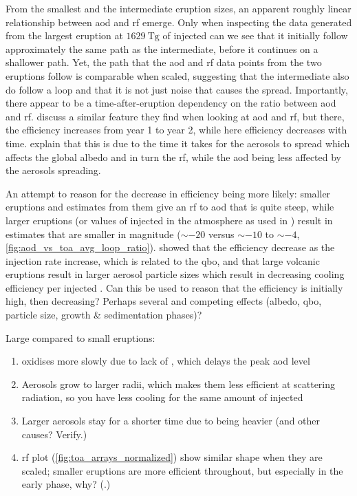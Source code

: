 \documentclass{ametsocV5}
\newcommand{\iso}[1][i]{{#1}njected \ce{SO2}}
\begin{document}
From the smallest and the intermediate eruption sizes, an apparent roughly linear
relationship between \ac{aod} and \ac{rf} emerge. Only when inspecting the data
generated from the largest eruption at \(\SI{1629}{\tera\gram}\) of \iso{} can we see
that it initially follow approximately the same path as the intermediate, before it
continues on a shallower path. Yet, the path that the \ac{aod} and \ac{rf} data points
from the two eruptions follow is comparable when scaled, suggesting that the
intermediate also do follow a loop and that it is not just noise that causes the spread.
Importantly, there appear to be a time-after-eruption dependency on the ratio between
\ac{aod} and \ac{rf}. \citet{marshall2020} discuss a similar feature they find when
looking at \ac{aod} and \ac{rf}, but there, the efficiency increases from year 1 to year
2, while here efficiency decreases with time. \citet{marshall2020} explain that this is
due to the time it takes for the aerosols to spread which affects the global albedo and
in turn the \ac{rf}, while the \ac{aod} being less affected by the aerosols spreading.

An attempt to reason for the decrease in efficiency being more likely: smaller eruptions
and estimates from them give an \ac{rf} to \ac{aod} that is quite steep, while larger
eruptions (or values of \iso{} in the atmosphere as used in \citet{niemeier2015}) result
in estimates that are smaller in magnitude (\(\sim-20\) versus \(\sim-10\) to
\(\sim-4\), \cref{fig:aod_vs_toa_avg_loop_ratio}). \citet{niemeier2017} showed that the
efficiency decrease as the injection rate increase, which is related to the \ac{qbo},
and that large volcanic eruptions result in larger aerosol particle sizes which result
in decreasing cooling efficiency per \iso{} \citep{english2013, timmreck2018}. Can this
be used to reason that the efficiency is initially high, then decreasing? Perhaps
several and competing effects (albedo, \ac{qbo}, particle size, growth \& sedimentation
phases)?

Large compared to small eruptions:

\begin{enumerate}
  \item {} oxidises more slowly due to lack of , which delays the peak \ac{aod}
        level
  \item Aerosols grow to larger radii, which makes them less efficient at scattering radiation,
        so you have less cooling for the same amount of \iso{}
  \item Larger aerosols stay for a shorter time due to being heavier (and other causes? Verify.)
  \item \ac{rf} plot (\cref{fig:toa_arrays_normalized}) show similar shape when they are scaled;
        smaller eruptions are more efficient throughout, but especially in the early phase, why?
        (.)
\end{enumerate}
\end{document}
